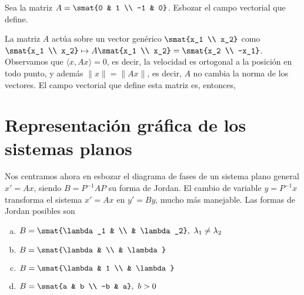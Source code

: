 \documentclass[../main.tex]{subfiles}
\begin{document}
\begin{example}
  Sea la matriz \(A = \smat{0 & 1 \\ -1 & 0}\). Esbozar el campo vectorial que
  define.

  La matriz \(A\) actúa sobre un vector genérico \(\smat{x_1 \\ x_2}\) como
  \(\smat{x_1 \\ x_2} \mapsto A\smat{x_1 \\ x_2} = \smat{x_2 \\ -x_1}\).
  Observamos que \(\langle x, Ax \rangle = 0\), es decir, la velocidad es
  ortogonal a la posición en todo punto, y además \(\|x\| = \|Ax\|\), es decir,
  \(A\) no cambia la norma de los vectores. El campo vectorial que define esta
  matriz es, entonces,

  \begin{figure}[ht]
    \centering
  \end{figure}
\end{example}

\section{Representación gráfica de los sistemas planos}

Nos centramos ahora en esbozar el diagrama de fases de un sistema plano general
\(x' = Ax\), siendo \(B = P^{-1}AP\) su forma de Jordan. El cambio de variable
\(y = P^{-1}x\) transforma el sistema \(x' = Ax\) en \(y' = By\), mucho más
manejable. Las formas de Jordan posibles son

\begin{enumerate}[a)]
\item \(B = \smat{\lambda_1 & \\ & \lambda_2},\ \lambda_1 \neq \lambda_2\)
\item \(B = \smat{\lambda & \\ & \lambda}\)
\item \(B = \smat{\lambda & 1 \\ & \lambda}\)
\item \(B = \smat{a & b \\ -b & a},\ b>0\)
\end{enumerate}
\end{document}
